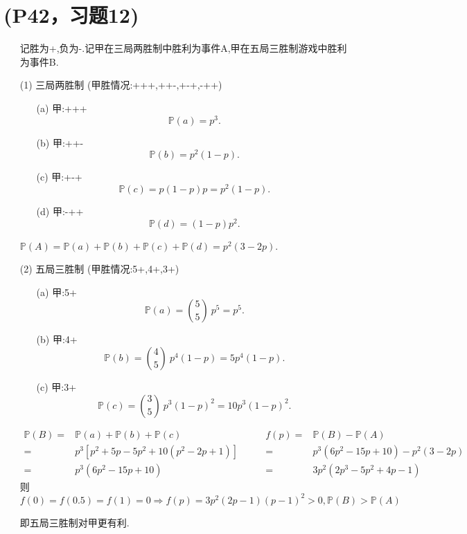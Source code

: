 \documentclass{article}
\begin{document}
\section{(P42，习题12)}
        \begin{enumerate}
            \item []记胜为+,负为-.记甲在三局两胜制中胜利为事件A,甲在五局三胜制游戏中胜利为事件B.
            \item [(1)]三局两胜制 (甲胜情况:+++,++-,+-+,-++)
            \begin{enumerate}
                \item [(a)]甲:+++ \[\mathbb{P}(a)=p^3.\]
                \item [(b)]甲:++- \[\mathbb{P}(b)=p^2 (1-p).\]
                \item [(c)]甲:+-+ \[\mathbb{P}(c)=p(1-p)p=p^2 (1-p).\]
                \item [(d)]甲:-++ \[\mathbb{P}(d)=(1-p)p^2.\]
            \end{enumerate}
            $\mathbb{P}(A)=\mathbb{P}(a)+\mathbb{P}(b)+\mathbb{P}(c)+\mathbb{P}(d)=p^2(3-2p)$.
            \item [(2)]五局三胜制 (甲胜情况:5+,4+,3+)
            \begin{enumerate}
                \item [(a)]甲:5+ \[\mathbb{P}(a)=\binom{5}{5} \ p^5=p^5.\]
                \item [(b)]甲:4+ \[\mathbb{P}(b)=\binom{4}{5} \ p^4 (1-p)=5 p^4(1-p).\]
                \item [(c)]甲:3+ \[\mathbb{P}(c)=\binom{3}{5} \ p^3 {(1-p)}^2 =10 p^3{(1-p)}^2.\]
            \end{enumerate}
            \[
              \begin{aligned}
                \mathbb{P}(B)
                = & \mathbb{P}(a)+\mathbb{P}(b)+\mathbb{P}(c)\\
                = & p^3[p^2+ 5p - 5p^2+ 10(p^2-2p+1)]\\
                = & p^3(6p^2-15p+10)
              \end{aligned}  
              \qquad
              \begin{aligned}
                f(p)
                = & \mathbb{P}(B)-\mathbb{P}(A)\\
                = & p^3(6p^2-15p+10)-p^2(3-2p)\\
                = & 3p^2(2p^3-5p^2+4p-1)
              \end{aligned}
            \]
            则
            \[
                f(0)=f(0.5)=f(1)=0 \Rightarrow f(p)=3p^{2}(2p-1){(p-1)}^2>0,\mathbb{P}(B)>\mathbb{P}(A)
            \]

            即五局三胜制对甲更有利.
        \end{enumerate}
\end{document}
